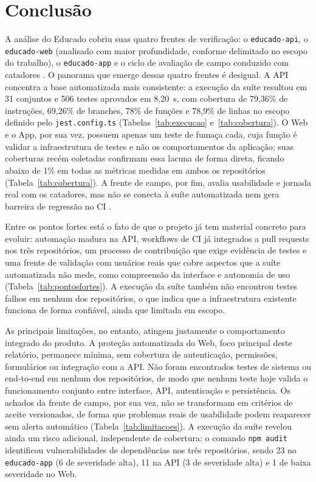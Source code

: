 \section{Conclusão}

A análise do Educado cobriu suas quatro frentes de verificação: o
\texttt{educado-api}, o \texttt{educado-web} (analisado com maior
profundidade, conforme delimitado no escopo do trabalho), o
\texttt{educado-app} e o ciclo de avaliação de campo conduzido com
catadores \cite{educado-repos,psp5,dashboard}. O panorama que emerge
dessas quatro frentes é desigual. A API concentra a base automatizada
mais consistente: a execução da suíte resultou em 31 conjuntos e 506
testes aprovados em 8,20~s, com cobertura de 79,36\% de instruções,
69,26\% de branches, 78\% de funções e 78,9\% de linhas no escopo
definido pelo \texttt{jest.config.ts} (Tabelas~\ref{tab:execucao}
e~\ref{tab:cobertura}). O Web e o App, por sua vez, possuem apenas um
teste de fumaça cada, cuja função é validar a infraestrutura de testes e
não os comportamentos da aplicação; suas coberturas recém coletadas
confirmam essa lacuna de forma direta, ficando abaixo de 1\% em todas as
métricas medidas em ambos os repositórios (Tabela~\ref{tab:cobertura}).
A frente de campo, por fim, avalia usabilidade e jornada real com os
catadores, mas não se conecta à suíte automatizada nem gera barreira de
regressão no CI \cite{psp5,dashboard}.

Entre os pontos fortes está o fato de que o projeto já tem material
concreto para evoluir: automação madura na API, workflows de CI já
integrados a pull requests nos três repositórios, um processo de
contribuição que exige evidência de testes e uma frente de validação com
usuários reais que cobre aspectos que a suíte automatizada não mede,
como compreensão da interface e autonomia de uso
(Tabela~\ref{tab:pontosfortes}). A execução da suíte também não
encontrou testes falhos em nenhum dos repositórios, o que indica que a
infraestrutura existente funciona de forma confiável, ainda que limitada
em escopo.

As principais limitações, no entanto, atingem justamente o comportamento
integrado do produto. A proteção automatizada do Web, foco principal
deste relatório, permanece mínima, sem cobertura de autenticação,
permissões, formulários ou integração com a API. Não foram encontrados
testes de sistema ou end-to-end em nenhum dos repositórios, de modo que
nenhum teste hoje valida o funcionamento conjunto entre interface, API,
autenticação e persistência. Os achados da frente de campo, por sua vez,
não se transformam em critérios de aceite versionados, de forma que
problemas reais de usabilidade podem reaparecer sem alerta automático
(Tabela~\ref{tab:limitacoes}). A execução da suíte revelou ainda um
risco adicional, independente de cobertura: o comando \texttt{npm audit}
identificou vulnerabilidades de dependências nos três repositórios,
sendo 23 no \texttt{educado-app} (6 de severidade alta), 11 na API (3 de
severidade alta) e 1 de baixa severidade no Web.

